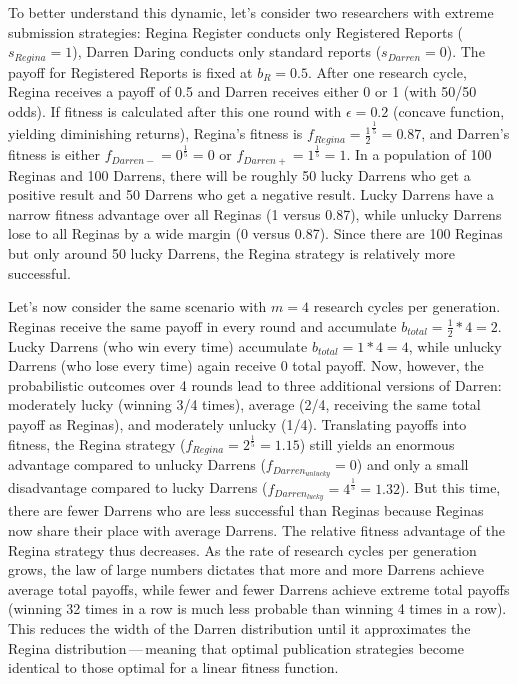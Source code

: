 \documentclass[
  british,
  a4paper,
  ,man,mask,floatsintext]{apa6}
\begin{document}
To better understand this dynamic, let's consider two researchers with extreme submission strategies:
Regina Register conducts only Registered Reports (\(s_{Regina} = 1\)), Darren Daring conducts only standard reports (\(s_{Darren} = 0\)).
The payoff for Registered Reports is fixed at \(b_{R} = 0.5\).
After one research cycle, Regina receives a payoff of 0.5 and Darren receives either 0 or 1 (with 50/50 odds).
If fitness is calculated after this one round with \(\epsilon = 0.2\) (concave function, yielding diminishing returns), Regina's fitness is \(f_{Regina} = \frac{1}{2}^{\frac{1}{5}} = 0.87\), and Darren's fitness is either \(f_{Darren-} = 0^{\frac{1}{5}} = 0\) or \(f_{Darren+} = 1^{\frac{1}{5}} = 1\).
In a population of 100 Reginas and 100 Darrens, there will be roughly 50 lucky Darrens who get a positive result and 50 Darrens who get a negative result.
Lucky Darrens have a narrow fitness advantage over all Reginas (1 versus 0.87), while unlucky Darrens lose to all Reginas by a wide margin (0 versus 0.87).
Since there are 100 Reginas but only around 50 lucky Darrens, the Regina strategy is relatively more successful.

Let's now consider the same scenario with \(m = 4\) research cycles per generation.
Reginas receive the same payoff in every round and accumulate \(b_{total} = \frac{1}{2} * 4 = 2\).
Lucky Darrens (who win every time) accumulate \(b_{total} = 1*4 = 4\), while unlucky Darrens (who lose every time) again receive 0 total payoff.
Now, however, the probabilistic outcomes over 4 rounds lead to three additional versions of Darren: moderately lucky (winning 3/4 times), average (2/4, receiving the same total payoff as Reginas), and moderately unlucky (1/4).
Translating payoffs into fitness, the Regina strategy (\(f_{Regina} = 2^\frac{1}{5} = 1.15\)) still yields an enormous advantage compared to unlucky Darrens (\(f_{Darren_{unlucky}} = 0\)) and only a small disadvantage compared to lucky Darrens (\(f_{Darren_{lucky}} = 4^\frac{1}{5} = 1.32\)).
But this time, there are fewer Darrens who are less successful than Reginas because Reginas now share their place with average Darrens.
The relative fitness advantage of the Regina strategy thus decreases.
As the rate of research cycles per generation grows, the law of large numbers dictates that more and more Darrens achieve average total payoffs, while fewer and fewer Darrens achieve extreme total payoffs (winning 32 times in a row is much less probable than winning 4 times in a row).
This reduces the width of the Darren distribution until it approximates the Regina distribution\(\,\)---\(\,\)meaning that optimal publication strategies become identical to those optimal for a linear fitness function.
\end{document}
